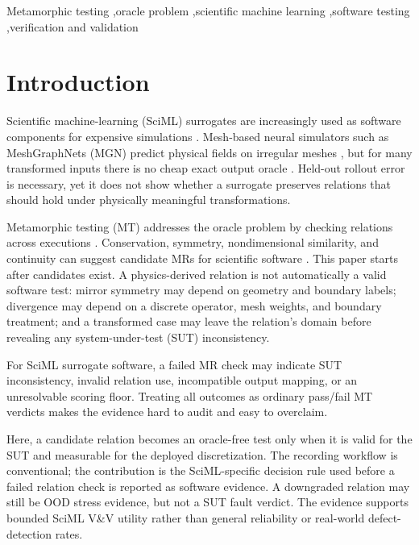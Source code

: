 \documentclass[preprint,12pt,authoryear]{elsarticle}
\begin{document}
\begin{frontmatter}
\begin{keyword}
Metamorphic testing \sep oracle problem \sep scientific machine learning \sep software testing \sep verification and validation
\end{keyword}

\end{frontmatter}

\section{Introduction}
\label{sec:introduction}

Scientific machine-learning (SciML) surrogates are increasingly used as software components for expensive simulations \citep{raissi2019pinn,karniadakis2021piml,li2021fno}. Mesh-based neural simulators such as MeshGraphNets (MGN) predict physical fields on irregular meshes \citep{pfaff2021meshgraphnets}, but for many transformed inputs there is no cheap exact output oracle \citep{barr2015oracle}. Held-out rollout error is necessary, yet it does not show whether a surrogate preserves relations that should hold under physically meaningful transformations.

Metamorphic testing (MT) addresses the oracle problem by checking relations across executions \citep{chen1998metamorphic,segura2016survey}. Conservation, symmetry, nondimensional similarity, and continuity can suggest candidate MRs for scientific software \citep{kanewala2019scientific,lin2020exploratory,olsen2019simulation}. This paper starts after candidates exist. A physics-derived relation is not automatically a valid software test: mirror symmetry may depend on geometry and boundary labels; divergence may depend on a discrete operator, mesh weights, and boundary treatment; and a transformed case may leave the relation's domain before revealing any system-under-test (SUT) inconsistency.

For SciML surrogate software, a failed MR check may indicate SUT inconsistency, invalid relation use, incompatible output mapping, or an unresolvable scoring floor. Treating all outcomes as ordinary pass/fail MT verdicts makes the evidence hard to audit and easy to overclaim.

Here, a candidate relation becomes an oracle-free test only when it is valid
for the SUT and measurable for the deployed discretization. The recording
workflow is conventional; the contribution is the SciML-specific decision rule
used before a failed relation check is reported as software evidence. A
downgraded relation may still be OOD stress evidence, but not a SUT fault
verdict. The evidence supports bounded SciML V\&V utility rather than general
reliability or real-world defect-detection rates.
\end{document}
